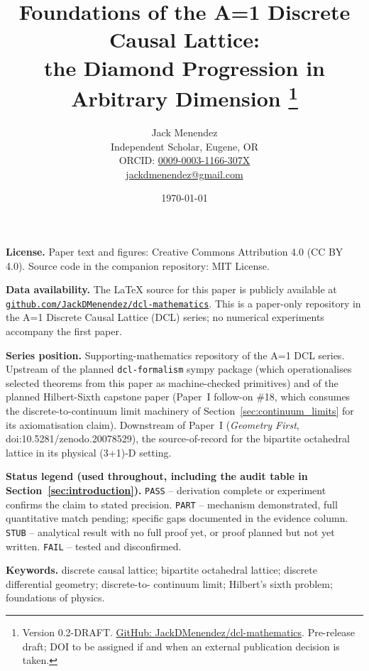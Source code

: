 \documentclass[12pt, letterpaper]{article}
\title{Foundations of the A=1 Discrete Causal Lattice:\\
       the Diamond Progression in Arbitrary Dimension%
       \thanks{Version 0.2-DRAFT.
       \href{https://github.com/JackDMenendez/dcl-mathematics}%
            {GitHub: JackDMenendez/dcl-mathematics}.
       Pre-release draft; DOI to be assigned if and when an external
       publication decision is taken.}}
\author{Jack Menendez\\
        \small Independent Scholar, Eugene, OR\\
        \small ORCID: \href{https://orcid.org/0009-0003-1166-307X}{0009-0003-1166-307X}\\
        \small \href{mailto:jackdmenendez@gmail.com}{jackdmenendez@gmail.com}}
\date{\today}
\begin{document}
\maketitle

\noindent\textbf{License.}  Paper text and figures: Creative Commons
Attribution 4.0 (CC BY 4.0).  Source code in the companion
repository: MIT License.

\medskip
\noindent\textbf{Data availability.}  The LaTeX source for this paper
is publicly available at
\href{https://github.com/JackDMenendez/dcl-mathematics}%
     {\nolinkurl{github.com/JackDMenendez/dcl-mathematics}}.
This is a paper-only repository in the A=1 Discrete Causal Lattice
(DCL) series; no numerical experiments accompany the first paper.

\medskip
\noindent\textbf{Series position.}  Supporting-mathematics repository
of the A=1 DCL series.  Upstream of the planned
\texttt{dcl-formalism} sympy package (which operationalises selected
theorems from this paper as machine-checked primitives) and of the
planned Hilbert-Sixth capstone paper (Paper~I follow-on \#18, which
consumes the discrete-to-continuum limit machinery of
Section~\ref{sec:continuum_limits} for its axiomatisation claim).
Downstream of Paper~I (\emph{Geometry First}, doi:10.5281/zenodo.20078529),
the source-of-record for the bipartite octahedral lattice in its
physical (3+1)-D setting.

\medskip
\noindent\textbf{Status legend (used throughout, including the audit
table in Section~\ref{sec:introduction}).}  \texttt{PASS} -- derivation
complete or experiment confirms the claim to stated precision.
\texttt{PART} -- mechanism demonstrated, full quantitative match
pending; specific gaps documented in the evidence column.
\texttt{STUB} -- analytical result with no full proof yet, or proof
planned but not yet written.  \texttt{FAIL} -- tested and
disconfirmed.

\medskip
\noindent\textbf{Keywords.}  discrete causal lattice; bipartite
octahedral lattice; discrete differential geometry; discrete-to-
continuum limit; Hilbert's sixth problem; foundations of physics.
\end{document}
